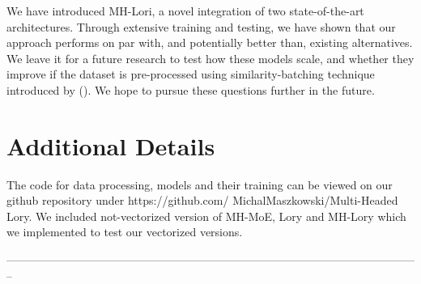 \documentclass[12pt]{article}
\begin{document}


We have introduced MH-Lori, a novel integration of two state-of-the-art architectures. Through extensive training and testing, we have shown that our approach performs on par with, and potentially better than, existing alternatives.
We leave it for a future research to test how these models scale, and whether they improve if the dataset is pre-processed using similarity-batching technique introduced by (\cite{shi2023context}). We hope to pursue these questions further in the future.



%


\printbibliography 

\appendix


\section{Additional Details}
The code for data processing, models and their training can be viewed on our github repository under https://github.com/
MichalMaszkowski/Multi-Headed Lory. We included not-vectorized version of MH-MoE, Lory and MH-Lory which we implemented to test our vectorized versions. 


% 
--------------------------------------------------------------------------------------------------------------
\end{document}
